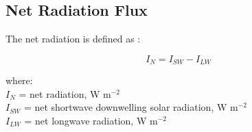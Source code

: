 \subsection{Net Radiation Flux}
\label{sec:rn}
The net radiation is defined as \parencite[Eq. 4]{linacre68}:

\begin{equation}
\label{eq:rn}
	I_N = I_{SW} - I_{LW}
\end{equation}

\noindent where: \\
\indent $I_N$ = net radiation, W m$^{-2}$ \\
\indent $I_{SW}$ = net shortwave downwelling solar radiation, W m$^{-2}$ \\
\indent $I_{LW}$ = net longwave radiation, W m$^{-2}$ \\

